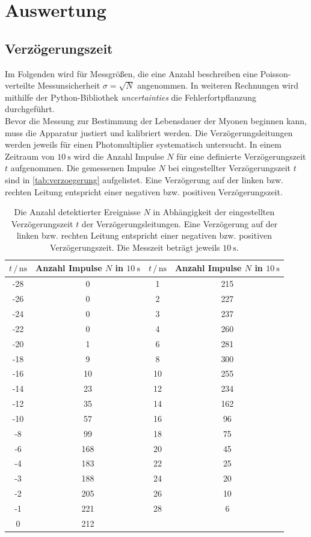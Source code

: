 \section{Auswertung}
\label{sec:Auswertung}

\subsection{Verzögerungszeit}
Im Folgenden wird für Messgrößen, die eine Anzahl beschreiben eine Poisson-verteilte Messunsicherheit $\sigma = \sqrt{N}$ angenommen.
In weiteren Rechnungen wird mithilfe der Python-Bibliothek \textit{uncertainties}\cite{uncertainties} die Fehlerfortpflanzung durchgeführt.
\\
Bevor die Messung zur Bestimmung der Lebensdauer der Myonen beginnen kann, muss die Apparatur justiert und kalibriert werden.
Die Verzögerungsleitungen werden jeweils für einen Photomultiplier systematisch untersucht.
In einem Zeitraum von $\qty{10}{\second}$ wird die Anzahl Impulse $N$ für eine definierte Verzögerungszeit $t$ aufgenommen.
Die gemessenen Impulse $N$ bei eingestellter Verzögerungszeit $t$ sind in \autoref{tab:verzoegerung} aufgelistet.
Eine Verzögerung auf der linken bzw. rechten Leitung entspricht einer negativen bzw. positiven Verzögerungszeit.
\begin{table}
    \centering
    \caption{Die Anzahl detektierter Ereignisse $N$ in Abhängigkeit der eingestellten Verzögerungszeit $t$ der Verzögerungsleitungen.
    Eine Verzögerung auf der linken bzw. rechten Leitung entspricht einer negativen bzw. positiven Verzögerungszeit.
    Die Messzeit beträgt jeweils $\qty{10}{\second}$.
    }
    \label{tab:verzoegerung}
    \begin{tabular}{cc|cc}
        \toprule
        $t \,/\, \unit{\nano\second}$ & Anzahl Impulse $N$ in $\qty{10}{\second}$ & $t \,/\, \unit{\nano\second}$ & Anzahl Impulse $N$ in $\qty{10}{\second}$ \\
        \midrule
        -28 & 0 & 1 & 215 \\
        -26 & 0 & 2 & 227 \\
        -24 & 0 & 3 & 237 \\
        -22 & 0 & 4 & 260 \\
        -20 & 1 & 6 & 281 \\
        -18 & 9 & 8 & 300 \\
        -16 & 10 & 10 & 255 \\
        -14 & 23 & 12 & 234 \\
        -12 & 35 & 14 & 162 \\
        -10 & 57 & 16 & 96 \\
        -8 & 99 & 18 & 75 \\
        -6 & 168 & 20 & 45 \\
        -4 & 183 & 22 & 25 \\
        -3 & 188 & 24 & 20 \\
        -2 & 205 & 26 & 10 \\
        -1 & 221 & 28 & 6 \\
        0 & 212 & & \\
        \bottomrule
    \end{tabular}
\end{table}
